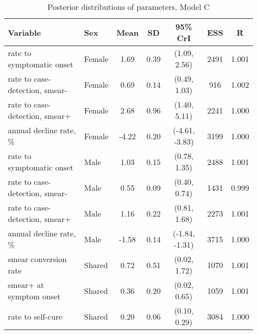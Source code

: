 \begin{table}[h]

\caption{\label{tab:}Posterior distributions of parameters, Model C}
\centering
\begin{tabular}[t]{llccccc}
\toprule
Variable & Sex & Mean & SD & 95\% CrI & ESS & \^{R}\\
\midrule
rate to symptomatic onset & Female & 1.69 & 0.39 & (1.09, 2.56) & 2491 & 1.001\\
rate to case-detection, smear- & Female & 0.69 & 0.14 & (0.49, 1.03) & 916 & 1.002\\
rate to case-detection, smear+ & Female & 2.68 & 0.96 & (1.40, 5.11) & 2241 & 1.000\\
annual decline rate, \% & Female & -4.22 & 0.20 & (-4.61, -3.83) & 3199 & 1.000\\
\addlinespace
rate to symptomatic onset & Male & 1.03 & 0.15 & (0.78, 1.35) & 2488 & 1.001\\
rate to case-detection, smear- & Male & 0.55 & 0.09 & (0.40, 0.74) & 1431 & 0.999\\
rate to case-detection, smear+ & Male & 1.16 & 0.22 & (0.81, 1.68) & 2273 & 1.001\\
annual decline rate, \% & Male & -1.58 & 0.14 & (-1.84, -1.31) & 3715 & 1.000\\
\addlinespace
smear conversion rate & Shared & 0.72 & 0.51 & (0.02, 1.72) & 1070 & 1.001\\
smear+ at symptom onset & Shared & 0.36 & 0.20 & (0.02, 0.65) & 1059 & 1.001\\
rate to self-cure & Shared & 0.20 & 0.06 & (0.10, 0.29) & 3084 & 1.000\\
\bottomrule
\end{tabular}
\end{table}
